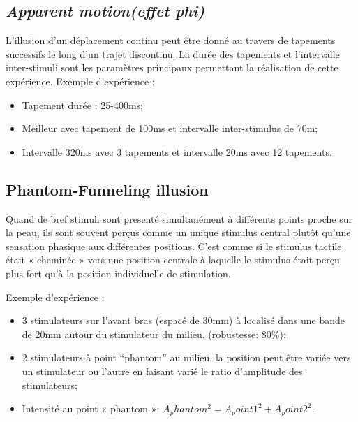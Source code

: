 \subsection{\textit{Apparent motion(effet phi)}}
L’illusion d’un déplacement continu peut être donné au travers de tapements successifs le long d’un trajet discontinu. La durée des tapements et l’intervalle inter-stimuli sont les paramètres principaux permettant la réalisation de cette expérience. Exemple d’expérience :
\begin{itemize}
	\item Tapement durée : 25-400ms;
	\item Meilleur avec tapement de 100ms et intervalle inter-stimulus de 70m;
	\item Intervalle 320ms avec 3 tapements et intervalle 20ms avec 12 tapements.
\end{itemize}

\subsection{Phantom-Funneling illusion}
Quand de bref stimuli sont presenté simultanément à différents points proche sur la peau, ils sont souvent perçus comme un unique stimulus central plutôt qu’une sensation phasique aux différentes positions. C’est comme si le stimulus tactile était « cheminée » vers une position centrale à laquelle le stimulus était perçu plus fort qu’à la position individuelle de stimulation.\par
Exemple d’expérience :
\begin{itemize}
	\item 3 stimulateurs sur l’avant bras (espacé de 30mm) à localisé dans une bande de 20mm autour du stimulateur du milieu. (robustesse: 80\%);
	\item 2 stimulateurs à point “phantom” au milieu, la position peut être variée vers un stimulateur ou l’autre en faisant varié le ratio d’amplitude des stimulateurs;
	\item Intensité au point « phantom »: $A_phantom^2= A_point1^2+A_point2^2$.
\end{itemize}

